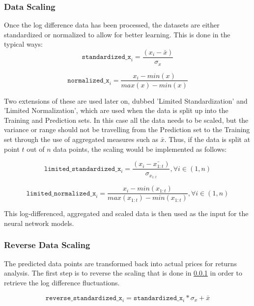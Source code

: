 \documentclass[a4paper,11pt,oneside]{article}
\theoremstyle{plain}
\theoremstyle{definition}
\begin{document}
\subsubsection{Data Scaling}\label{data_scaling}
Once the log difference data has been processed, the datasets are either standardized or normalized to allow for better learning. This is done in the typical ways:
\begin{equation}
\texttt{standardized\_x}_i = \frac{(x_i - \bar{x}) }{\sigma_x}
\end{equation}

\begin{equation}
\texttt{normalized\_x}_i = \frac{x_i - min(x) }{max(x) - min(x)}
\end{equation}

Two extensions of these are used later on, dubbed 'Limited Standardization' and 'Limited Normalization', which are used when the data is split up into the Training and Prediction sets. In this case all the data needs to be scaled, but the variance or range should not be travelling from the Prediction set to the Training set through the use of aggregated measures such as $\bar{x}$. Thus, if the data is split at point $t$ out of $n$ data points, the scaling would be implemented as follows:

\begin{equation}
\texttt{limited\_standardized\_x}_i = \frac{(x_i - \bar{x_{1:t}}) }{\sigma_{x_{1:t}}} , \forall  i \in (1, n)
\end{equation}

\begin{equation}
\texttt{limited\_normalized\_x}_i = \frac{x_i - min(x_{1:t}) }{max(x_{1:t}) - min(x_{1:t})} , \forall  i \in (1, n)
\end{equation}


This log-differenced, aggregated and scaled data is then used as the input for the neural network models.

\subsubsection{Reverse Data Scaling}\label{data_reverse_scaling}

The predicted data points are transformed back into actual prices for returns analysis. The first step is to reverse the scaling that is done in \ref{data_scaling} in order to retrieve the log difference fluctuations.

\begin{equation}
\texttt{reverse\_standardized\_x}_i = \texttt{standardized\_x}_i * \sigma_x + \bar{x}
\end{equation}
\end{document}
